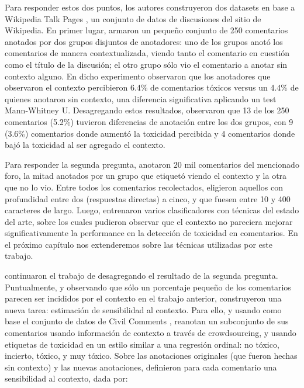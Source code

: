 Para responder estos dos puntos, los autores construyeron dos datasets en base a Wikipedia Talk Pages \cite{hua-etal-2018-wikiconv}, un conjunto de datos de discusiones del sitio de Wikipedia. En primer lugar, armaron un pequeño conjunto de 250 comentarios anotados por dos grupos disjuntos de anotadores: uno de los grupos anotó los comentarios de manera contextualizada, viendo tanto el comentario en cuestión como el título de la discusión; el otro grupo sólo vio el comentario a anotar sin contexto alguno. En dicho experimento observaron que los anotadores que observaron el contexto percibieron 6.4\% de comentarios tóxicos versus un 4.4\% de quienes anotaron sin contexto, una diferencia significativa aplicando un test Mann-Whitney U. Desagregando estos resultados, observaron que 13 de los 250 comentarios (5.2\%) tuvieron diferencias de anotación entre los dos grupos, con 9 (3.6\%) comentarios donde aumentó la toxicidad percibida y 4 comentarios donde bajó la toxicidad al ser agregado el contexto.

Para responder la segunda pregunta, anotaron $20$ mil comentarios del mencionado foro, la mitad anotados por un grupo que etiquetó viendo el contexto y la otra que no lo vio. Entre todos los comentarios recolectados, eligieron aquellos con profundidad entre dos (respuestas directas) a cinco, y que fuesen entre 10 y 400 caracteres de largo. Luego, entrenaron varios clasificadores con técnicas del estado del arte, sobre los cuales pudieron observar que el contexto no pareciera mejorar significativamente la performance en la detección de toxicidad en comentarios. En el próximo capítulo nos extenderemos sobre las técnicas utilizadas por este trabajo.

\citet{xenos-2021-context} continuaron el trabajo de \citet{pavlopoulos2020toxicity} desagregando el resultado de la segunda pregunta. Puntualmente, y observando que sólo un porcentaje pequeño de los comentarios parecen ser incididos por el contexto en el trabajo anterior, construyeron una nueva tarea: estimación de sensibilidad al contexto. Para ello, y usando como base el conjunto de datos de Civil Comments \cite{borkan2019civil}, reanotan un subconjunto de sus comentarios usando información de contexto a través de crowdsourcing, y usando etiquetas de toxicidad en un estilo similar a una regresión ordinal: no tóxico, incierto, tóxico, y muy tóxico. Sobre las anotaciones originales (que fueron hechas sin contexto) y las nuevas anotaciones, definieron para cada comentario una sensibilidad al contexto, dada por:

